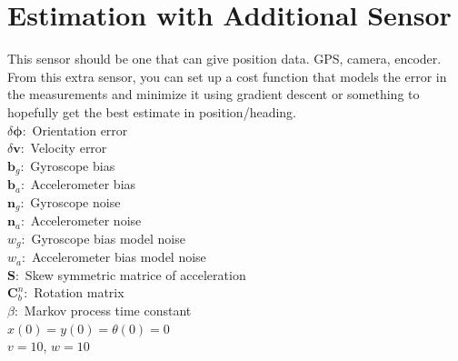 \section{Estimation with Additional Sensor}

This sensor should be one that can give position data. GPS, camera, encoder.
From this extra sensor, you can set up a cost function that models the error 
in the measurements and minimize it using gradient descent or something to 
hopefully get the best estimate in position/heading. \\
$\delta\boldsymbol{\phi}:$ Orientation error \\
$\delta\boldsymbol{v}:$ Velocity error \\
$\boldsymbol{b}_g:$ Gyroscope bias \\
$\boldsymbol{b}_a:$ Accelerometer bias \\
$\boldsymbol{n}_g:$ Gyroscope noise \\
$\boldsymbol{n}_a:$ Accelerometer noise \\
$w_g:$ Gyroscope bias model noise \\
$w_a:$ Accelerometer bias model noise \\
$\boldsymbol{S}:$ Skew symmetric matrice of acceleration \\
$\boldsymbol{C}^n_b:$ Rotation matrix \\
$\beta:$ Markov process time constant \\
$x(0) = y(0) = \theta(0) = 0$ \\
$v = 10$, $w = 10$

